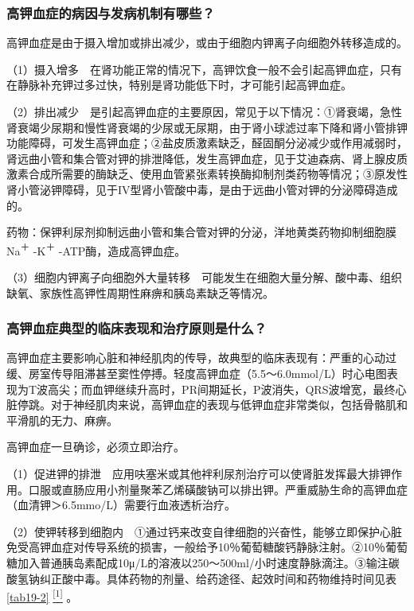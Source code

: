 \subsubsection{高钾血症的病因与发病机制有哪些？}

高钾血症是由于摄入增加或排出减少，或由于细胞内钾离子向细胞外转移造成的。

（1）摄入增多　在肾功能正常的情况下，高钾饮食一般不会引起高钾血症，只有在静脉补充钾过多过快，特别是肾功能低下时，才可能引起高钾血症。

（2）排出减少　是引起高钾血症的主要原因，常见于以下情况：①肾衰竭，急性肾衰竭少尿期和慢性肾衰竭的少尿或无尿期，由于肾小球滤过率下降和肾小管排钾功能障碍，可发生高钾血症；②盐皮质激素缺乏，醛固酮分泌减少或作用减弱时，肾远曲小管和集合管对钾的排泄降低，发生高钾血症，见于艾迪森病、肾上腺皮质激素合成所需要的酶缺乏、使用血管紧张素转换酶抑制剂类药物等情况；③原发性肾小管泌钾障碍，见于IV型肾小管酸中毒，是由于远曲小管对钾的分泌障碍造成的。

药物：保钾利尿剂抑制远曲小管和集合管对钾的分泌，洋地黄类药物抑制细胞膜Na\textsuperscript{＋}
-K\textsuperscript{＋} -ATP酶，造成高钾血症。

（3）细胞内钾离子向细胞外大量转移　可能发生在细胞大量分解、酸中毒、组织缺氧、家族性高钾性周期性麻痹和胰岛素缺乏等情况。

\subsubsection{高钾血症典型的临床表现和治疗原则是什么？}

高钾血症主要影响心脏和神经肌肉的传导，故典型的临床表现有：严重的心动过缓、房室传导阻滞甚至窦性停搏。轻度高钾血症（5.5～6.0mmol/L）时心电图表现为T波高尖；而血钾继续升高时，PR间期延长，P波消失，QRS波增宽，最终心脏停跳。对于神经肌肉来说，高钾血症的表现与低钾血症非常类似，包括骨骼肌和平滑肌的无力、麻痹。

高钾血症一旦确诊，必须立即治疗。

（1）促进钾的排泄　应用呋塞米或其他袢利尿剂治疗可以使肾脏发挥最大排钾作用。口服或直肠应用小剂量聚苯乙烯磺酸钠可以排出钾。严重威胁生命的高钾血症（血清钾＞6.5mmo/L）需要行血液透析治疗。

（2）使钾转移到细胞内　①通过钙来改变自律细胞的兴奋性，能够立即保护心脏免受高钾血症对传导系统的损害，一般给予10％葡萄糖酸钙静脉注射。②10％葡萄糖加入普通胰岛素配成10μ/L的溶液以250～500ml/小时速度静脉滴注。③输注碳酸氢钠纠正酸中毒。具体药物的剂量、给药途径、起效时间和药物维持时间见表\ref{tab19-2}
\protect\hyperlink{text00025.htmlux5cux23ch1-24}{\textsuperscript{{[}1{]}}}
。

